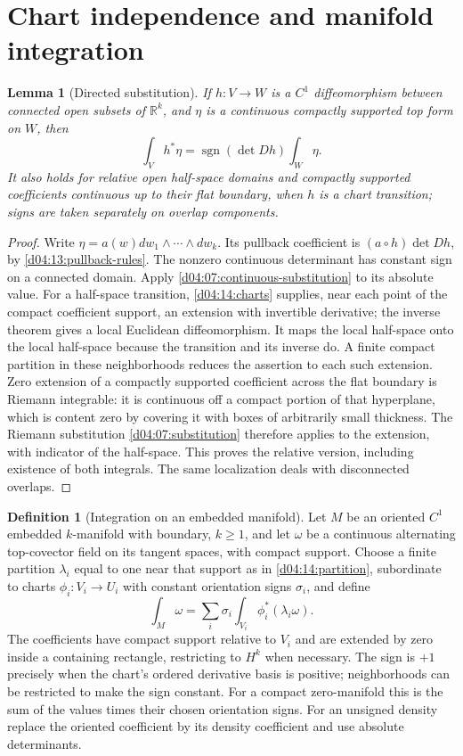 \documentclass[11pt,oneside,openany]{book}
\newtheorem{lemma}[theorem]{Lemma}
\theoremstyle{definition}
\newtheorem{definition}[theorem]{Definition}
\theoremstyle{remark}
\newcommand{\R}{\mathbb R}
\DeclareMathOperator{\sgn}{sgn}
\newcommand{\family}[1]{}
\begin{document}
\section{Chart independence and manifold integration}
\family{K04.15.03}\family{K04.15.04}\family{K04.15.10}
\begin{lemma}[Directed substitution]\label{d04:15:directed-substitution}
If $h:V\to W$ is a $C^1$ diffeomorphism between connected open subsets
of $\R^k$, and $\eta$ is a continuous compactly supported top form on $W$,
then
\[
 \int_Vh^*\eta=\sgn(\det Dh)\int_W\eta.
\]
It also holds for relative open half-space domains and compactly supported
coefficients continuous up to their flat boundary, when $h$ is a chart
transition; signs are taken separately on overlap components.
\end{lemma}
\begin{proof}
Write $\eta=a(w)dw_1\wedge\cdots\wedge dw_k$. Its pullback coefficient
is $(a\circ h)\det Dh$, by \cref{d04:13:pullback-rules}.
The nonzero continuous determinant has constant sign on a connected domain.
Apply \cref{d04:07:continuous-substitution} to its absolute value.
For a half-space transition, \cref{d04:14:charts} supplies, near each point
of the compact coefficient support, an extension with invertible derivative;
the inverse theorem gives a local Euclidean diffeomorphism. It maps the
local half-space onto the local half-space because the transition and its
inverse do. A finite compact partition in these neighborhoods reduces the
assertion to each such extension. Zero extension of a compactly supported
coefficient across the flat boundary is Riemann integrable: it is continuous
off a compact portion of that hyperplane, which is content zero by covering
it with boxes of arbitrarily small thickness. The Riemann substitution
\cref{d04:07:substitution} therefore applies to the extension, with indicator
of the half-space. This proves the relative version, including existence of
both integrals. The same localization deals with disconnected overlaps.
\end{proof}

\begin{definition}[Integration on an embedded manifold]\label{d04:15:manifold-integral}
Let $M$ be an oriented $C^1$ embedded $k$-manifold with boundary, $k\ge1$, and let
$\omega$ be a continuous alternating top-covector field on its tangent
spaces, with compact support. Choose a finite partition $\lambda_i$ equal
to one near that support as in \cref{d04:14:partition}, subordinate to
charts $\phi_i:V_i\to U_i$ with constant orientation signs $\sigma_i$, and define
\[
 \int_M\omega=\sum_i\sigma_i\int_{V_i}\phi_i^*(\lambda_i\omega).
\]
The coefficients have compact support relative to $V_i$ and are extended
by zero inside a containing rectangle, restricting to $H^k$ when necessary.
The sign is $+1$ precisely when the chart's ordered derivative basis is
positive; neighborhoods can be restricted to make the sign constant.
For a compact zero-manifold this is the sum of the values times their
chosen orientation signs. For an unsigned density replace the oriented
coefficient by its density coefficient and use absolute determinants.
\end{definition}
\end{document}
